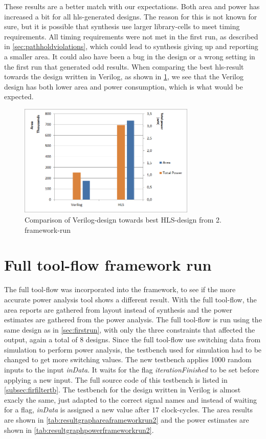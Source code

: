 These results are a better match with our expectations. Both area and power has increased a bit for all \gls{hls}-generated designs. The reason for this is not known for sure, but it is possible that synthesis use larger library-cells to meet timing requirements. All timing requirements were not met in the first run, as described in \cref{sec:pathholdviolations}, which could lead to synthesis giving up and reporting a smaller area. It could also have been a bug in the design or a wrong setting in the first run that generated odd results. When comparing the best \gls{hls}-result towards the design written in Verilog, as shown in \cref{fig:resultcomparisonhlsrun2}, we see that the Verilog design has both lower area and power consumption, which is what would be expected.

\begin{figure}[hbpt]
\centering
\includegraphics[width=0.75\textwidth]{../figs/resultComparison2.png}
\caption{\label{fig:resultcomparisonhlsrun2}Comparison of Verilog-design towards best HLS-design from 2. framework-run}
\end{figure}

\section{\label{sec:fullflowresults}Full tool-flow framework run}
The full tool-flow was incorporated into the framework, to see if the more accurate power analysis tool shows a different result. With the full tool-flow, the area reports are gathered from layout instead of synthesis and the power estimates are gathered from the power analysis. The full tool-flow is run using the same design as in \cref{sec:firstrun}, with only the three constraints that affected the output, again a total of 8 designs. Since the full tool-flow use switching data from simulation to perform power analysis, the testbench used for simulation had to be changed to get more switching values. The new testbench applies 1000 random inputs to the input \textit{inData}. It waits for the flag \textit{iterationFinished} to be set before applying a new input. The full source code of this testbench is listed in \cref{subsec:firfiltertb}. The testbench for the design written in Verilog is almost exacly the same, just adapted to the correct signal names and instead of waiting for a flag, \textit{inData} is assigned a new value after 17 clock-cycles. The area results are shown in \cref{tab:resultgraphareaframeworkrun2} and the power estimates are shown in \cref{tab:resultgraphpowerframeworkrun2}.

